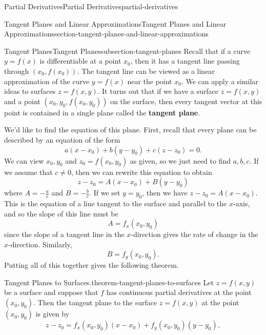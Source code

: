 \documentclass[oneside,10pt,]{book}
\newcommand{\terminology}[1]{\textbf{#1}}
\numberwithin{equation}{section}
\begin{document}
\begin{chapterptx}{Partial Derivatives}{}{Partial Derivatives}{}{}{partial-derivatives}
\begin{sectionptx}{Tangent Planes and Linear Approximations}{}{Tangent Planes and Linear Approximations}{}{}{section-tangent-planes-and-linear-approximations}
\typeout{************************************************}
%
\begin{subsectionptx}{Tangent Planes}{}{Tangent Planes}{}{}{subsection-tangent-planes}
\hypertarget{p-1373}{}%
Recall that if a curve \(y=f(x)\) is differentiable at a point \(x_{0}\), then it has a tangent line passing through \((x_{0},f(x_{0})).\) The tangent line can be viewed as a linear approximation of the curve \(y=f(x)\) near the point \(x_{0}\). We can apply a similar ideas to surfaces \(z = f(x,y)\). It turns out that if we have a surface \(z = f(x,y)\) and a point \((x_{0},y_{0}, f(x_{0},y_{0}))\) on the surface, then every tangent vector at this point is contained in a single plane called the \terminology{tangent plane}.%
\par
\hypertarget{p-1374}{}%
We'd like to find the equation of this plane. First, recall that every plane can be described by an equation of the form%
\begin{equation*}
a(x-x_{0})+b(y-y_{0})+c(z-z_{0}) = 0.
\end{equation*}
We can view \(x_{0},y_{0}\) and \(z_{0} = f(x_{0},y_{0})\) as given, so we just need to find \(a,b,c\). If we assume that \(c\neq 0\), then we can rewrite this equation to obtain%
\begin{equation*}
z-z_{0} = A(x-x_{0}) + B(y-y_{0})
\end{equation*}
where \(A = -\frac{a}{c}\) and \(B = -\frac{b}{c}\). If we set \(y=y_{0}\), then we have \(z-z_{0} = A(x-x_{0})\). This is the equation of a line tangent to the surface and parallel to the \(x\)-axis, and so the slope of this line must be%
\begin{equation*}
A = f_{x}(x_{0},y_{0})
\end{equation*}
since the slope of a tangent line in the \(x\)-direction gives the rate of change in the \(x\)-direction. Similarly,%
\begin{equation*}
B = f_{y}(x_{0},y_{0}).
\end{equation*}
Putting all of this together gives the following theorem.%
\begin{theorem}{Tangent Planes to Surfaces.}{}{theorem-tangent-planes-to-surfaces}%
\hypertarget{p-1375}{}%
Let \(z = f(x,y)\) be a surface and suppose that \(f\) has continuous partial derivatives at the point \((x_{0},y_{0})\). Then the tangent plane to the surface \(z = f(x,y)\) at the point \((x_{0},y_{0})\) is given by%
\begin{equation*}
z - z_{0} = f_{x}(x_{0},y_{0})(x - x_{0}) + f_{y}(x_{0},y_{0})(y - y_{0}),

\end{equation*}
\end{theorem}
\end{subsectionptx}
\end{sectionptx}
\end{chapterptx}
\end{document}
